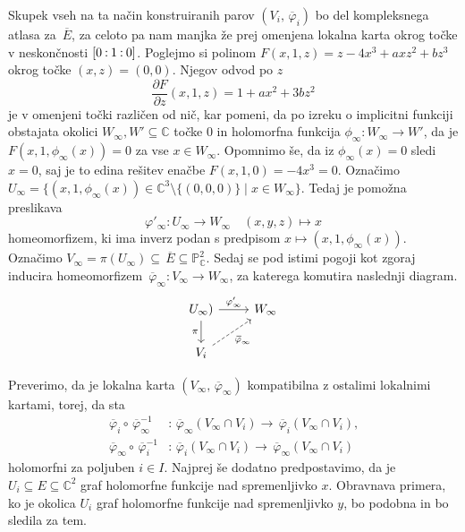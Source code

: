 \documentclass[mat1]{fmfdelo}
\numberwithin{equation}{section}
\newcommand{\C}{\mathbb C}
\newcommand{\PC}{\mathbb{P}^2_\C}
\newcommand{\inv}{^{-1}}
\newcommand{\pcoor}[1]{%
\begingroup\lccode`~=`: \lowercase{\endgroup
\edef~}{\mathbin{\mathchar\the\mathcode`:}\nobreak}%
\left[%
\begingroup
\mathcode`:=\string"8000
#1%
\endgroup
\right]%
}
\newcommand{\pdv}[2][]{\frac{\partial#1}{\partial#2}}
\newcommand{\olsi}[1]{\,\overline{\!{#1}}} %
\theoremstyle{definition}
\begin{document}
Skupek vseh na ta način konstruiranih parov $(V_i, \olsi{\varphi}_i)$ bo del kompleksnega atlasa za $\olsi{E}$, za celoto pa nam manjka že prej omenjena lokalna karta okrog točke v neskončnosti $\pcoor{0 : 1 : 0}$. Poglejmo si polinom $F(x, 1, z) = z - 4x^3 + axz^2 + bz^3$ okrog točke $(x,z) = (0,0)$. Njegov odvod po $z$ 
\[
    \pdv[F]{z}(x,1,z) = 1 + ax^2 + 3bz^2
\]
je v omenjeni točki različen od nič, kar pomeni, da po izreku o implicitni funkciji obstajata okolici $W_\infty, W' \subseteq \C$ točke $0$ in holomorfna funkcija $\phi_\infty : W_\infty \to W'$, da je $F(x, 1, \phi_\infty(x)) = 0$ za vse $x \in W_\infty$. Opomnimo še, da iz $\phi_\infty(x) = 0$ sledi $x = 0$, saj je to edina rešitev enačbe $F(x, 1, 0) = -4x^3 = 0$. Označimo $U_\infty = \{(x, 1, \phi_\infty(x)) \in \C^3 \setminus \{(0,0,0)\}\mid x \in W_\infty\}$. Tedaj je pomožna preslikava 
\[
    \varphi'_\infty : U_\infty \to W_\infty \quad (x,y,z) \mapsto x
\]
homeomorfizem, ki ima inverz podan s predpisom $x \mapsto (x,1,\phi_\infty(x))$. Označimo $V_\infty = \pi(U_\infty) \subseteq \olsi{E} \subseteq \PC$. Sedaj se pod istimi pogoji kot zgoraj inducira homeomorfizem $\olsi{\varphi}_\infty : V_\infty \to W_\infty$, za katerega komutira naslednji diagram.
%
\begin{equation}
    \label{projektivna karta v inf diagram}  
    \begin{tikzcd}
	{U_\infty)} & {W_\infty} \\
	{V_i}
	\arrow["{\varphi'_\infty}", from=1-1, to=1-2]
	\arrow["\pi"', from=1-1, to=2-1]
	\arrow["{\olsi{\varphi}_\infty}"', dashed, from=2-1, to=1-2]
    \end{tikzcd}
\end{equation}

Preverimo, da je lokalna karta $(V_\infty, \olsi{\varphi}_\infty)$ kompatibilna z ostalimi lokalnimi kartami, torej, da sta
\begin{align*}
    \olsi{\varphi}_i \circ \olsi{\varphi}_\infty\inv &: \olsi{\varphi}_\infty(V_\infty \cap V_i) \to \olsi{\varphi}_i(V_\infty \cap V_i), \\
    \olsi{\varphi}_\infty \circ \olsi{\varphi}_i\inv &: \olsi{\varphi}_i(V_\infty \cap V_i) \to \olsi{\varphi}_\infty(V_\infty \cap V_i)
\end{align*}
holomorfni za poljuben $i \in I$. Najprej še dodatno predpostavimo, da je $U_i \subseteq E \subseteq \C^2$ graf holomorfne funkcije nad spremenljivko $x$. Obravnava primera, ko je okolica $U_i$ graf holomorfne funkcije nad spremenljivko $y$, bo podobna in bo sledila za tem.
\end{document}
